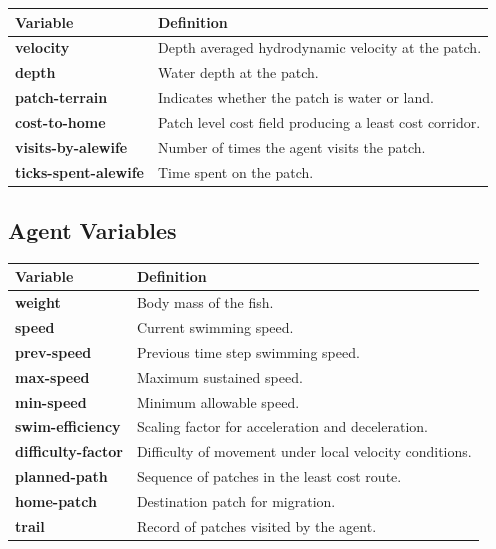 \documentclass[
]{book}
\begin{document}
\begin{longtable}[]{@{}
  >{\centering\arraybackslash}p{}
  >{\centering\arraybackslash}p{}@{}}
\toprule\noalign{}
\begin{minipage}[b]{\linewidth}\centering
Variable
\end{minipage} & \begin{minipage}[b]{\linewidth}\centering
Definition
\end{minipage} \\
\midrule\noalign{}
\endhead
\bottomrule\noalign{}
\endlastfoot
\textbf{velocity} & Depth averaged hydrodynamic velocity at the patch. \\
\textbf{depth} & Water depth at the patch. \\
\textbf{patch-terrain} & Indicates whether the patch is water or land. \\
\textbf{cost-to-home} & Patch level cost field producing a least cost corridor. \\
\textbf{visits-by-alewife} & Number of times the agent visits the patch. \\
\textbf{ticks-spent-alewife} & Time spent on the patch. \\
\end{longtable}

\subsection{Agent Variables}\label{agent-variables-7}

\begin{longtable}[]{@{}
  >{\centering\arraybackslash}p{}
  >{\centering\arraybackslash}p{}@{}}
\toprule\noalign{}
\begin{minipage}[b]{\linewidth}\centering
Variable
\end{minipage} & \begin{minipage}[b]{\linewidth}\centering
Definition
\end{minipage} \\
\midrule\noalign{}
\endhead
\bottomrule\noalign{}
\endlastfoot
\textbf{weight} & Body mass of the fish. \\
\textbf{speed} & Current swimming speed. \\
\textbf{prev-speed} & Previous time step swimming speed. \\
\textbf{max-speed} & Maximum sustained speed. \\
\textbf{min-speed} & Minimum allowable speed. \\
\textbf{swim-efficiency} & Scaling factor for acceleration and deceleration. \\
\textbf{difficulty-factor} & Difficulty of movement under local velocity conditions. \\
\textbf{planned-path} & Sequence of patches in the least cost route. \\
\textbf{home-patch} & Destination patch for migration. \\
\textbf{trail} & Record of patches visited by the agent. \\
\end{longtable}
\end{document}
